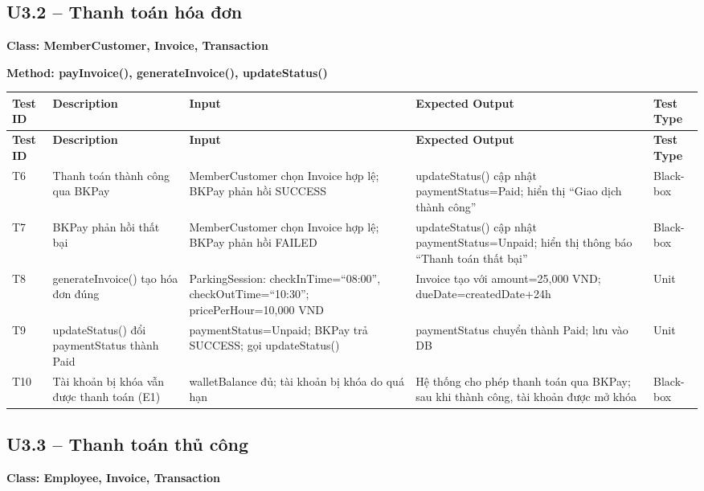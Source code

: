 \subsection{U3.2 -- Thanh toán hóa đơn}
\textbf{Class: MemberCustomer, Invoice, Transaction}

\textbf{Method: payInvoice(), generateInvoice(), updateStatus()}
\begin{longtable}{C{1.3cm} L{3cm} L{4.5cm} L{5cm} C{2.0cm}}
\toprule
\textbf{Test ID} & \textbf{Description} & \textbf{Input} & \textbf{Expected Output} & \textbf{Test Type} \\
\midrule
\endfirsthead
\toprule
\textbf{Test ID} & \textbf{Description} & \textbf{Input} & \textbf{Expected Output} & \textbf{Test Type} \\
\midrule
\endhead
\bottomrule
\endlastfoot
 
T6 &
Thanh toán thành công qua BKPay &
MemberCustomer chọn Invoice hợp lệ; BKPay phản hồi SUCCESS &
updateStatus() cập nhật paymentStatus=Paid; hiển thị ``Giao dịch thành công'' &
Black-box \\
\midrule
 
T7 &
BKPay phản hồi thất bại &
MemberCustomer chọn Invoice hợp lệ; BKPay phản hồi FAILED &
updateStatus() cập nhật paymentStatus=Unpaid; hiển thị thông báo ``Thanh toán thất bại'' &
Black-box \\
\midrule
 
T8 &
generateInvoice() tạo hóa đơn đúng &
ParkingSession: checkInTime=``08:00'', checkOutTime=``10:30''; pricePerHour=10,000 VND &
Invoice tạo với amount=25,000 VND; dueDate=createdDate+24h &
Unit \\
\midrule
 
T9 &
updateStatus() đổi paymentStatus thành Paid &
paymentStatus=Unpaid; BKPay trả SUCCESS; gọi updateStatus() &
paymentStatus chuyển thành Paid; lưu vào DB &
Unit \\
\midrule
 
T10 &
Tài khoản bị khóa vẫn được thanh toán (E1) &
walletBalance đủ; tài khoản bị khóa do quá hạn &
Hệ thống cho phép thanh toán qua BKPay; sau khi thành công, tài khoản được mở khóa &
Black-box \\
 
\end{longtable}
 
 
\subsection{U3.3 -- Thanh toán thủ công}
\textbf{Class: Employee, Invoice, Transaction}

